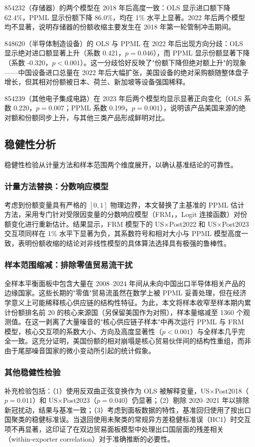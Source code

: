 854232（存储器）的两个模型在 2018 年后高度一致：OLS 显示进口额下降 62.4\%，PPML 显示份额下降 86.0\%，均在 1\% 水平上显著。2022 年后两个模型均不显著，说明存储器的份额收缩主要发生在 2018 年第一轮管制冲击期间。

848620（半导体制造设备）的 OLS 与 PPML 在 2022 年后出现方向分歧：OLS 显示绝对进口额显著上升（系数 0.421，$p=0.046$），而 PPML 显示份额显著下降（系数 -0.320，$p<0.001$）。这一分歧恰好反映了"份额下降但绝对额上升"的现象——中国设备进口总量在 2022 年后大幅扩张，美国设备的绝对采购额随整体盘子增长，但其相对份额被日本、荷兰、新加坡等设备强国稀释。

854239（其他电子集成电路）在 2023 年后两个模型均显示显著正向变化（OLS 系数 0.220，$p=0.007$；PPML 系数 0.199，$p=0.001$），说明该产品美国来源的绝对额和份额同步上升，与其他三类产品形成鲜明对比。



\subsection{稳健性分析}

稳健性检验从计量方法和样本范围两个维度展开，以确认基准结论的可靠性。

\subsubsection{计量方法替换：分数响应模型}

考虑到份额变量具有严格的 $[0,1]$ 物理边界，本文替换了主基准的 PPML 估计方法，采用专门针对受限因变量的分数响应模型（FRM，\citet{papke_wooldridge_1996}，Logit 连接函数）对份额变化进行重新估计。结果显示，FRM 模型下的 US$\times$Post2022 和 US$\times$Post2023 交互项同样在 1\% 水平下显著为负，其系数符号和相对大小与 PPML 模型高度一致，表明份额收缩的结论对非线性模型的具体算法选择具有极强的鲁棒性。

\subsubsection{样本范围缩减：排除零值贸易流干扰}

全样本平衡面板中包含大量在 2008--2024 年间从未向中国出口半导体相关产品的边缘国家。这些长期的"零值"贸易流虽然在数学上被 PPML 妥善处理，但在经济学意义上可能稀释核心供应链的结构性特征。为此，本文将样本收窄至样本期内累计份额排名前 20 的核心来源国（另保留美国作为对照），样本量缩减至 1360 个观测值。在这一剥离了大量噪音的"核心供应链子样本"中再次运行 PPML 与 FRM 模型，核心交互项的系数大小、方向及高度显著性（$p<0.001$）与全样本几乎完全一致。这充分证明，美国份额的相对崩塌是核心贸易伙伴间的结构性重组，而非由于尾部噪音国家的微小变动所引起的统计假象。

\subsubsection{其他稳健性检验}

补充检验包括：（1）使用反双曲正弦变换作为 OLS 被解释变量，US$\times$Post2018（$p=0.011$）和 US$\times$Post2023（$p=0.040$）仍显著；（2）剔除 2020--2021 年以排除新冠扰动，结果与基准一致；（3）考虑到面板数据的特性，基准回归使用了按出口国聚类的稳健标准误。当退回使用未聚类的常规异方差稳健标准误（HC1）时交互项不再显著，这印证了在双边贸易面板模型中处理出口国层面的残差相关（within-exporter correlation）对于准确推断的必要性。
